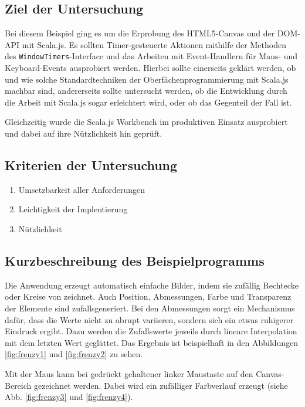 \documentclass[a4paper, 12pt, hidelinks, listof=totoc, listoftables=totoc, bibliography=totoc]{scrreprt}
\begin{document}
\subsection{Ziel der Untersuchung}

Bei diesem Beispiel ging es um die Erprobung des HTML5-Canvas und der DOM-API mit Scala.js. Es sollten Timer-gesteuerte Aktionen mithilfe der Methoden des \texttt{WindowTimers}-Interface und das Arbeiten mit Event-Handlern für Maus- und Keyboard-Events ausprobiert werden. Hierbei sollte einerseits geklärt werden, ob und wie solche Standardtechniken der Oberfächenprogrammierung mit Scala.js machbar sind, andererseits sollte untersucht werden, ob die Entwicklung durch die Arbeit mit Scala.js sogar erleichtert wird, oder ob das Gegenteil der Fall ist.

Gleichzeitig wurde die Scala.js Workbench im produktiven Einsatz ausprobiert und dabei auf ihre Nützlichkeit hin geprüft.

\subsection{Kriterien der Untersuchung}

\begin{enumerate}
	\item Umsetzbarkeit aller Anforderungen
	\item Leichtigkeit der Implentierung
	\item Nützlichkeit
\end{enumerate}

\subsection{Kurzbeschreibung des Beispielprogramms}

Die Anwendung erzeugt automatisch einfache Bilder, indem sie zufällig Rechtecke oder Kreise von zeichnet. Auch Position, Abmessungen, Farbe und Transparenz der Elemente sind zufallsgeneriert. Bei den Abmessungen sorgt ein Mechanismus dafür, dass die Werte nicht zu abrupt variieren, sondern sich ein etwas ruhigerer Eindruck ergibt. Dazu werden die Zufallswerte jeweils durch lineare Interpolation mit dem letzten Wert geglättet. Das Ergebnis ist beispielhaft in den Abbildungen \ref{fig:frenzy1} und \ref{fig:frenzy2} zu sehen.

Mit der Maus kann bei gedrückt gehaltener linker Maustaste auf den Canvas-Bereich gezeichnet werden. Dabei wird ein zufälliger Farbverlauf erzeugt (siehe Abb. \ref{fig:frenzy3} und \ref{fig:frenzy4}).
\end{document}
